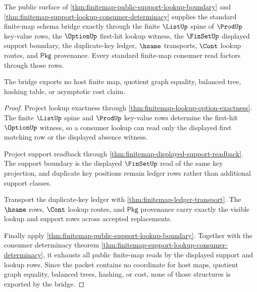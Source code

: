 \begin{theorem}
\label{thm:finitemap-standard-schema-bridge-boundary}
The public surface of
\autoref{thm:finitemap-public-support-lookup-boundary} and
\autoref{thm:finitemap-support-lookup-consumer-determinacy} supplies the
standard finite-map schema bridge exactly through the finite $\ListUp$ spine of
$\ProdUp$ key-value rows, the $\OptionUp$ first-hit lookup witness, the
$\FinSetUp$ displayed support boundary, the duplicate-key ledger, $\hsame$
transports, $\Cont$ lookup routes, and $\mathsf{Pkg}$ provenance. Every
standard finite-map consumer read factors through those rows.

The bridge exports no host finite map, quotient graph equality, balanced tree,
hashing table, or asymptotic cost claim.
\end{theorem}
\begin{proof}
Project lookup exactness through
\autoref{thm:finitemap-lookup-option-exactness}. The finite $\ListUp$ spine
and $\ProdUp$ key-value rows determine the first-hit $\OptionUp$ witness, so a
consumer lookup can read only the displayed first matching row or the displayed
absence witness.

Project support readback through
\autoref{thm:finitemap-displayed-support-readback}. The support boundary is
the displayed $\FinSetUp$ read of the same key projection, and duplicate key
positions remain ledger rows rather than additional support classes.

Transport the duplicate-key ledger with
\autoref{thm:finitemap-ledger-transport}. The $\hsame$ rows, $\Cont$ lookup
routes, and $\mathsf{Pkg}$ provenance carry exactly the visible lookup and
support rows across accepted replacements.

Finally apply \autoref{thm:finitemap-public-support-lookup-boundary}. Together
with the consumer determinacy theorem
\autoref{thm:finitemap-support-lookup-consumer-determinacy}, it exhausts all
public finite-map reads by the displayed support and lookup rows. Since the
packet contains no coordinate for host maps, quotient graph equality, balanced
trees, hashing, or cost, none of those structures is exported by the bridge.
\end{proof}


